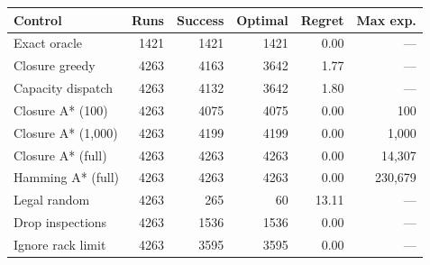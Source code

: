 \begin{tabular}{lrrrrr}\toprule
Control & Runs & Success & Optimal & Regret & Max exp.\\\midrule
Exact oracle & 1421 & 1421 & 1421 & 0.00 & ---\\
Closure greedy & 4263 & 4163 & 3642 & 1.77 & ---\\
Capacity dispatch & 4263 & 4132 & 3642 & 1.80 & ---\\
Closure A* (100) & 4263 & 4075 & 4075 & 0.00 & 100\\
Closure A* (1,000) & 4263 & 4199 & 4199 & 0.00 & 1,000\\
Closure A* (full) & 4263 & 4263 & 4263 & 0.00 & 14,307\\
Hamming A* (full) & 4263 & 4263 & 4263 & 0.00 & 230,679\\
Legal random & 4263 & 265 & 60 & 13.11 & ---\\
Drop inspections & 4263 & 1536 & 1536 & 0.00 & ---\\
Ignore rack limit & 4263 & 3595 & 3595 & 0.00 & ---\\
\bottomrule\end{tabular}
